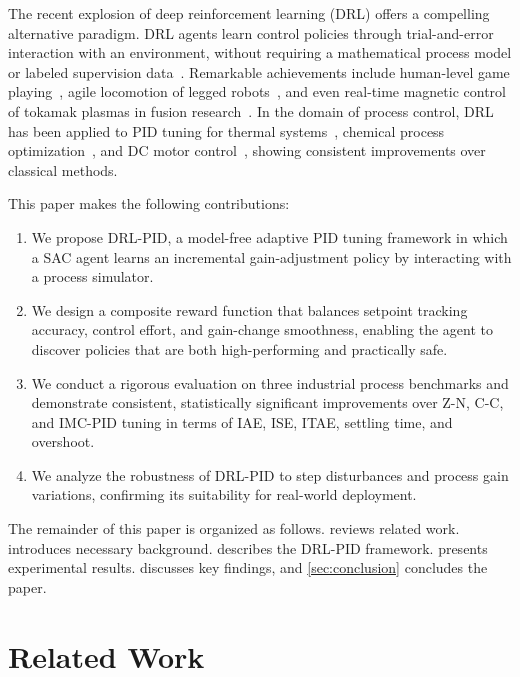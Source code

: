 \documentclass[conference,a4paper]{IEEEtran}[2015/08/26]
\begin{document}
The recent explosion of deep reinforcement learning (DRL) offers a
compelling alternative paradigm. DRL agents learn control policies
through trial-and-error interaction with an environment, without
requiring a mathematical process model or labeled supervision
data~\cite{Sutton2018}. Remarkable achievements include human-level game
playing~\cite{Mnih2015,Silver2016}, agile locomotion of legged
robots~\cite{Hwangbo2019}, and even real-time magnetic control of
tokamak plasmas in fusion research~\cite{Degrave2022}. In the domain of
process control, DRL has been applied to PID tuning for thermal
systems~\cite{Koch2019}, chemical process optimization~\cite{Spielberg2019},
and DC motor control~\cite{Carlucho2017}, showing consistent improvements
over classical methods.

This paper makes the following contributions:
\begin{enumerate}
  \item We propose DRL-PID, a model-free adaptive PID tuning framework
    in which a SAC agent learns an incremental gain-adjustment policy
    by interacting with a process simulator.
  \item We design a composite reward function that balances setpoint
    tracking accuracy, control effort, and gain-change smoothness,
    enabling the agent to discover policies that are both high-performing
    and practically safe.
  \item We conduct a rigorous evaluation on three industrial process
    benchmarks and demonstrate consistent, statistically significant
    improvements over Z-N, C-C, and IMC-PID tuning in terms of IAE,
    ISE, ITAE, settling time, and overshoot.
  \item We analyze the robustness of DRL-PID to step disturbances and
    process gain variations, confirming its suitability for real-world
    deployment.
\end{enumerate}

The remainder of this paper is organized as follows. 
reviews related work.  introduces necessary background.
 describes the DRL-PID framework. 
presents experimental results.  discusses key
findings, and \cref{sec:conclusion} concludes the paper.

\section{Related Work}
\label{sec:related}
\end{document}
